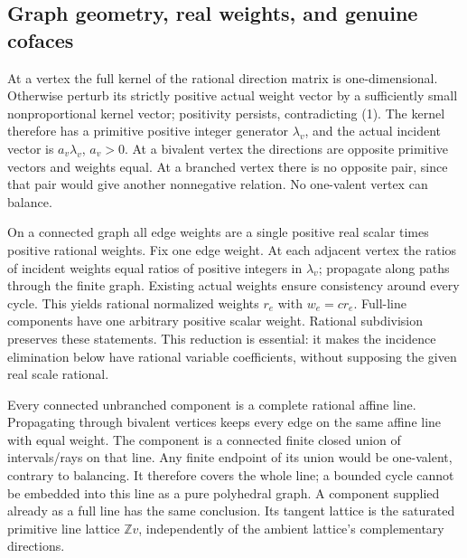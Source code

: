 \documentclass[
  11pt,
]{article}
\begin{document}
\subsection{Graph geometry, real weights, and genuine
cofaces}\label{graph-geometry-real-weights-and-genuine-cofaces}

At a vertex the full kernel of the rational direction matrix is
one-dimensional. Otherwise perturb its strictly positive actual weight
vector by a sufficiently small nonproportional kernel vector; positivity
persists, contradicting (1). The kernel therefore has a primitive
positive integer generator \(\lambda_v\), and the actual incident vector
is \(a_v\lambda_v\), \(a_v>0\). At a bivalent vertex the directions are
opposite primitive vectors and weights equal. At a branched vertex there
is no opposite pair, since that pair would give another nonnegative
relation. No one-valent vertex can balance.

On a connected graph all edge weights are a single positive real scalar
times positive rational weights. Fix one edge weight. At each adjacent
vertex the ratios of incident weights equal ratios of positive integers
in \(\lambda_v\); propagate along paths through the finite graph.
Existing actual weights ensure consistency around every cycle. This
yields rational normalized weights \(r_e\) with \(w_e=c r_e\). Full-line
components have one arbitrary positive scalar weight. Rational
subdivision preserves these statements. This reduction is essential: it
makes the incidence elimination below have rational variable
coefficients, without supposing the given real scale rational.

Every connected unbranched component is a complete rational affine line.
Propagating through bivalent vertices keeps every edge on the same
affine line with equal weight. The component is a connected finite
closed union of intervals/rays on that line. Any finite endpoint of its
union would be one-valent, contrary to balancing. It therefore covers
the whole line; a bounded cycle cannot be embedded into this line as a
pure polyhedral graph. A component supplied already as a full line has
the same conclusion. Its tangent lattice is the saturated primitive line
lattice \(\mathbb{Z}v\), independently of the ambient lattice's
complementary directions.
\end{document}
